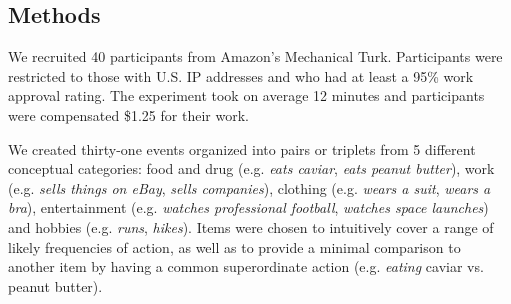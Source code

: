 \documentclass[10pt,letterpaper]{article}
\begin{document}
\subsection{Methods}

We recruited 40 participants from Amazon's Mechanical Turk.
Participants were restricted to those with U.S. IP addresses and who had at least a 95\% work approval rating.
The experiment took on average 12 minutes and participants were compensated \$1.25 for their work.

We created thirty-one events organized into pairs or triplets from 5 different conceptual categories: food and drug (e.g. \emph{eats caviar}, \emph{eats peanut butter}), work (e.g. \emph{sells things on eBay}, \emph{sells companies}), clothing (e.g. \emph{wears a suit}, \emph{wears a bra}), entertainment (e.g. \emph{watches professional football}, \emph{watches space launches}) and hobbies (e.g. \emph{runs}, \emph{hikes}). 
Items were chosen to intuitively cover a range of likely frequencies of action, as well as to provide a minimal comparison to another item by having a common superordinate action (e.g. \emph{eating} caviar vs. peanut butter).
\end{document}
